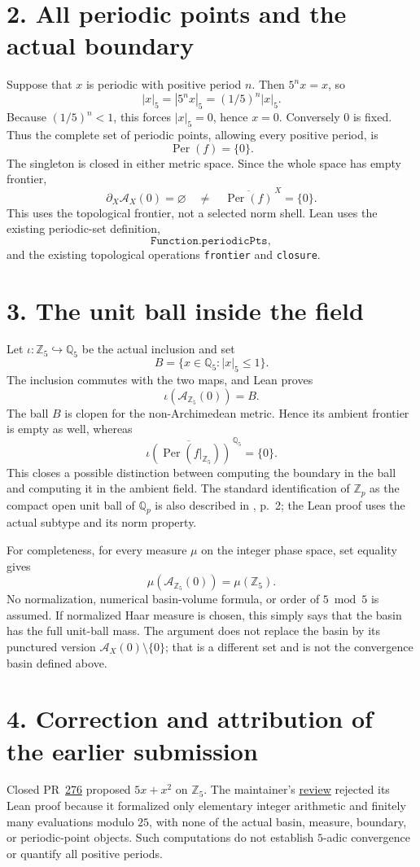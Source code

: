 \documentclass[10pt]{article}
\newcommand{\Qp}{\mathbb{Q}_5}\newcommand{\Zp}{\mathbb{Z}_5}
\begin{document}
\section*{2. All periodic points and the actual boundary}
Suppose that $x$ is periodic with positive period $n$. Then $5^n x=x$, so
\[
|x|_5=|5^n x|_5=(1/5)^n|x|_5.
\]
Because $(1/5)^n<1$, this forces $|x|_5=0$, hence $x=0$. Conversely $0$ is fixed. Thus the complete set of periodic points, allowing every positive period, is
\[
\operatorname{Per}(f)=\{0\}.
\]
The singleton is closed in either metric space. Since the whole space has empty frontier,
\[
\partial_X\mathcal A_X(0)=\varnothing
\quad\ne\quad
\overline{\operatorname{Per}(f)}^{\,X}=\{0\}.
\]
This uses the topological frontier, not a selected norm shell. Lean uses the existing periodic-set definition,
\[
\texttt{Function.periodicPts},
\]
and the existing topological operations \texttt{frontier} and \texttt{closure}.

\section*{3. The unit ball inside the field}
Let $\iota:\Zp\hookrightarrow\Qp$ be the actual inclusion and set
\[
B=\{x\in\Qp:|x|_5\le1\}.
\]
The inclusion commutes with the two maps, and Lean proves
\[
\iota(\mathcal A_{\Zp}(0))=B.
\]
The ball $B$ is clopen for the non-Archimedean metric. Hence its ambient frontier is empty as well, whereas
\[
\overline{\iota(\operatorname{Per}(f|_{\Zp}))}^{\,\Qp}=\{0\}.
\]
This closes a possible distinction between computing the boundary in the ball and computing it in the ambient field. The standard identification of $\mathbb Z_p$ as the compact open unit ball of $\mathbb Q_p$ is also described in \cite{FL}, p.~2; the Lean proof uses the actual subtype and its norm property.

For completeness, for every measure $\mu$ on the integer phase space, set equality gives
\[
\mu(\mathcal A_{\Zp}(0))=\mu(\Zp).
\]
No normalization, numerical basin-volume formula, or order of $5\bmod5$ is assumed. If normalized Haar measure is chosen, this simply says that the basin has the full unit-ball mass. The argument does not replace the basin by its punctured version $\mathcal A_X(0)\setminus\{0\}$; that is a different set and is not the convergence basin defined above.

\section*{4. Correction and attribution of the earlier submission}
Closed PR~\href{https://github.com/The-Last-Math-Competition/The-Last-Math-Competition/pull/276}{276} proposed $5x+x^2$ on $\Zp$. The maintainer's \href{https://github.com/The-Last-Math-Competition/The-Last-Math-Competition/pull/276\#issuecomment-5965086534}{review} rejected its Lean proof because it formalized only elementary integer arithmetic and finitely many evaluations modulo $25$, with none of the actual basin, measure, boundary, or periodic-point objects. Such computations do not establish $5$-adic convergence or quantify all positive periods.
\end{document}
